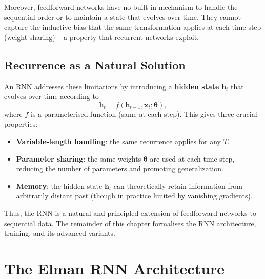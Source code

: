 \documentclass{tufte-handout}
\begin{document}
Moreover, feedforward networks have no built‑in mechanism to handle the sequential order or to maintain a state that evolves over time. They cannot capture the inductive bias that the same transformation applies at each time step (weight sharing) – a property that recurrent networks exploit.

\begin{marginfigure}
\centering
{}
\caption{Feedforward networks treat each time step independently; they cannot share weights across time or maintain a dynamic state.}
\end{marginfigure}

\subsection{Recurrence as a Natural Solution}

An RNN addresses these limitations by introducing a \textbf{hidden state} $\mathbf{h}_t$ that evolves over time according to
\[
\mathbf{h}_t = f(\mathbf{h}_{t-1}, \mathbf{x}_t; \boldsymbol{\theta}),
\]
where $f$ is a parameterised function (same at each step). This gives three crucial properties:
\begin{itemize}
    \item \textbf{Variable‑length handling}: the same recurrence applies for any $T$.
    \item \textbf{Parameter sharing}: the same weights $\boldsymbol{\theta}$ are used at each time step, reducing the number of parameters and promoting generalization.
    \item \textbf{Memory}: the hidden state $\mathbf{h}_t$ can theoretically retain information from arbitrarily distant past (though in practice limited by vanishing gradients).
\end{itemize}

Thus, the RNN is a natural and principled extension of feedforward networks to sequential data. The remainder of this chapter formalises the RNN architecture, training, and its advanced variants.

\section{The Elman RNN Architecture}
\end{document}
